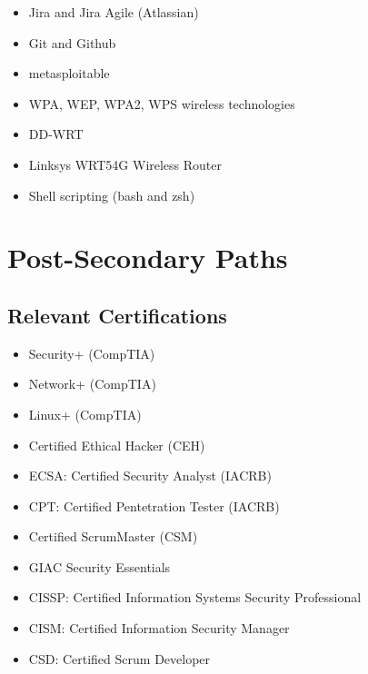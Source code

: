 \documentclass[letterpaper,10pt,english]{sphinxmanual}
\begin{document}
\begin{itemize}
\item {} 
Jira and Jira Agile (Atlassian)

\item {} 
Git and Github

\item {} 
metasploitable

\item {} 
WPA, WEP, WPA2, WPS wireless technologies

\item {} 
DD-WRT

\item {} 
Linksys WRT54G Wireless Router

\item {} 
Shell scripting (bash and zsh)

\end{itemize}


\section{Post-Secondary Paths}
\label{cybersecurity:post-secondary-paths}

\subsection{Relevant Certifications}
\label{cybersecurity:relevant-certifications}\begin{itemize}
\item {} 
Security+ (CompTIA)

\item {} 
Network+ (CompTIA)

\item {} 
Linux+ (CompTIA)

\item {} 
Certified Ethical Hacker (CEH)

\item {} 
ECSA: Certified Security Analyst (IACRB)

\item {} 
CPT: Certified Pentetration Tester (IACRB)

\item {} 
Certified ScrumMaster (CSM)

\item {} 
GIAC Security Essentials

\item {} 
CISSP: Certified Information Systems Security Professional

\item {} 
CISM: Certified Information Security Manager

\item {} 
CSD: Certified Scrum Developer

\end{itemize}
\end{document}
